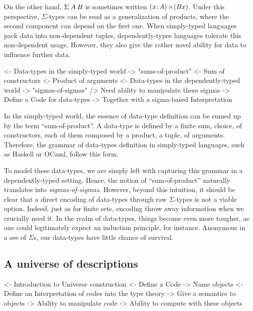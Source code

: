 On the other hand, $\SigmaTy{A}{B}$ is sometimes written
$\SIGMA{\V{x}}{A} (B x)$. Under this perspective, $\Sigma$-types can
be read as a generalization of products, where the second component
can depend on the first one. When simply-typed languages pack data
into non-dependent tuples, dependently-types languages tolerate this
non-dependent usage. However, they also give the rather novel ability
for data to influence further data.

\begin{wstructure}
<- Data-types in the simply-typed world
    -> "sums-of-product"
        <- Sum of constructors
        <- Product of arguments
<- Data-types in the dependently-typed world
    -> "sigmas-of-sigmas"
    /> Need ability to manipulate these sigmas
        -> Define a Code for data-types
        -> Together with a sigma-based Interpretation
\end{wstructure}

In the simply-typed world, the essence of data-type definition can be
sumed up by the term ``sum-of-product''. A data-type is defined by a
finite sum, choice, of constructors, each of them composed by a
product, a tuple, of arguments. Therefore, the grammar of data-types
definition in simply-typed languages, such as Haskell or OCaml, follow
this form.

To model these data-types, we are simply left with capturing this
grammar in a dependently-typed setting. Hence, the notion of
``sum-of-product'' naturally translates into
\emph{sigmas-of-sigmas}. However, beyond this intuition, it should be
clear that a direct encoding of data-types through raw $\Sigma$-types
is not a viable option. Indeed, just as for finite sets, encoding
throw away information when we crucially need it. In the realm of
data-types, things become even more tougher, as one could legitimately
expect an induction principle, for instance. Anonymous in a see of
$\Sigma$s, our data-types have little chance of survival.


\subsection{A universe of descriptions}

\begin{wstructure}
<- Introduction to Universe construction
    <- Define a Code
        -> Name objects
    <- Define an Interpretation of codes into the type theory
        -> Give a semantics to objects
    -> Ability to manipulate code
    -> Ability to compute with these objects
\end{wstructure}

